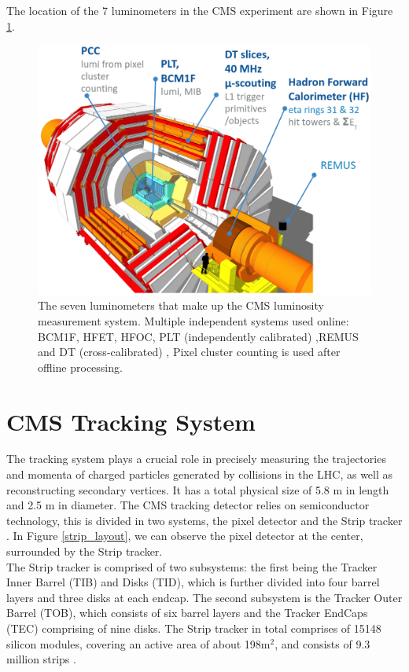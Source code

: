 The location of the 7 luminometers in the CMS experiment are shown in Figure \ref{luminometers}.

\begin{center}
  \begin{figure}[ht]
    \centering
    \includegraphics[scale=.3]{Chapter2/detectors.png}
    \caption[CMS Luminometers]{The seven luminometers that make up the CMS luminosity measurement system. Multiple independent systems used online: BCM1F, HFET, HFOC, PLT (independently calibrated) ,REMUS and  DT (cross-calibrated) , Pixel cluster counting is used after offline processing.}
    \label{luminometers}
  \end{figure}
\end{center}

\section{CMS Tracking System}

The tracking system plays a crucial role in precisely measuring the trajectories and momenta of charged particles generated by collisions in the LHC, as well as reconstructing secondary vertices. It has a total physical size of 5.8 m in length and 2.5 m in diameter. 
The CMS tracking detector relies on semiconductor technology, this is divided in two systems, the pixel detector and the Strip tracker \cite{CMS_Exp_2008}. In Figure \ref{strip_layout}, we can observe the pixel detector at the center, surrounded by the Strip tracker.\\

The Strip tracker is comprised of two subsystems: the first being the Tracker Inner Barrel (TIB) and Disks (TID), which is further divided into four barrel layers and three disks at each endcap. The second subsystem is the Tracker Outer Barrel (TOB), which consists of six barrel layers and the Tracker EndCaps (TEC) comprising of nine disks. The Strip tracker in total comprises of 15148 silicon modules, covering an active area of about 198$\text{m}^{2}$, and consists of 9.3 million strips \cite{CMS_Exp_2008}. \\

